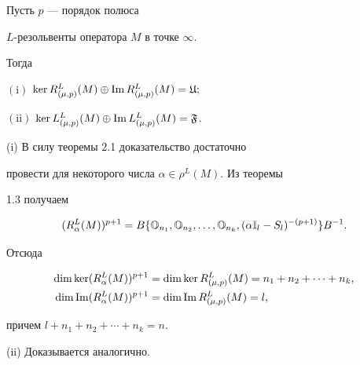 \begin{thms}


Пусть $p$ --- порядок полюса


$L$-резольвенты оператора $M$ в точке $\infty$.


Тогда





$\mathrm{(i)}$ $\ker R^L_{(\mu, p)} (M) \oplus \im


R^L_{(\mu, p)} (M) = {\frak U};$





$\mathrm{(ii)}$ $\ker L^L_{(\mu, p)} (M) \oplus \im


L^L_{(\mu, p)} (M) = {\frak F}$. 


\end{thms}





\begin{pf}


(i) В силу теоремы 2.1 доказательство достаточно


провести для некоторого числа $\alpha\in\rho^L (M)$. Из теоремы


1.3 получаем


$$


(R_\alpha^L (M))^{p+1} = B\{{\Bbb O}_{n_1}, {\Bbb


O}_{n_2},\dotsc, {\Bbb O}_{n_k}, (\alpha {\Bbb I}_l -


S_l)^{-(p+1)}\} B^{-1}.


$$


Отсюда


\begin{align*}


\dim\ker (R^L_{\alpha}


(M))^{p+1} &= \dim\ker R^L_{(\mu, p)} (M) = n_1 + n_2 + \dotsb +


n_k, \\


\dim \im (R^L_{\alpha} (M))^{p+1}


&= \dim \im R^L_{(\mu, p)} (M) = l,


\end{align*}


причем $l+ n_1 + n_2 + \dotsb + n_k = n$.





(ii) Доказывается аналогично.


\end{pf}





